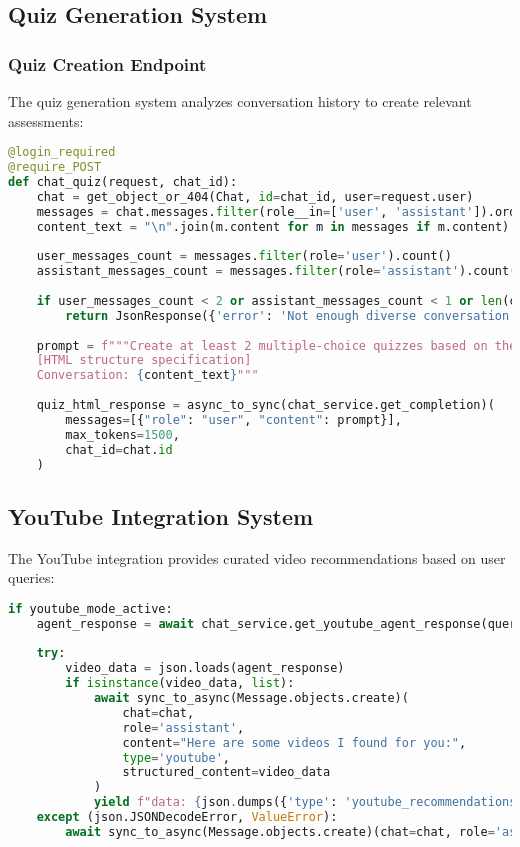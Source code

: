 \documentclass[12pt,a4paper]{article}
\begin{document}
\subsection{Quiz Generation System}

\subsubsection{Quiz Creation Endpoint}

The quiz generation system analyzes conversation history to create relevant assessments:

\begin{lstlisting}[language=Python, caption=Quiz Generation Logic]
@login_required
@require_POST
def chat_quiz(request, chat_id):
    chat = get_object_or_404(Chat, id=chat_id, user=request.user)
    messages = chat.messages.filter(role__in=['user', 'assistant']).order_by('created_at')
    content_text = "\n".join(m.content for m in messages if m.content)
    
    user_messages_count = messages.filter(role='user').count()
    assistant_messages_count = messages.filter(role='assistant').count()
    
    if user_messages_count < 2 or assistant_messages_count < 1 or len(content_text) < 200:
        return JsonResponse({'error': 'Not enough diverse conversation content'}, status=400)
    
    prompt = f"""Create at least 2 multiple-choice quizzes based on the conversation...
    [HTML structure specification]
    Conversation: {content_text}"""
    
    quiz_html_response = async_to_sync(chat_service.get_completion)(
        messages=[{"role": "user", "content": prompt}],
        max_tokens=1500,
        chat_id=chat.id
    )
\end{lstlisting}

\subsection{YouTube Integration System}

The YouTube integration provides curated video recommendations based on user queries:

\begin{lstlisting}[language=Python, caption=YouTube Integration Flow]
if youtube_mode_active:
    agent_response = await chat_service.get_youtube_agent_response(query_for_youtube_agent)
    
    try:
        video_data = json.loads(agent_response)
        if isinstance(video_data, list):
            await sync_to_async(Message.objects.create)(
                chat=chat, 
                role='assistant', 
                content="Here are some videos I found for you:",
                type='youtube',
                structured_content=video_data
            )
            yield f"data: {json.dumps({'type': 'youtube_recommendations', 'data': video_data})}\n\n"
    except (json.JSONDecodeError, ValueError):
        await sync_to_async(Message.objects.create)(chat=chat, role='assistant', content=agent_response)
\end{lstlisting}
\end{document}
